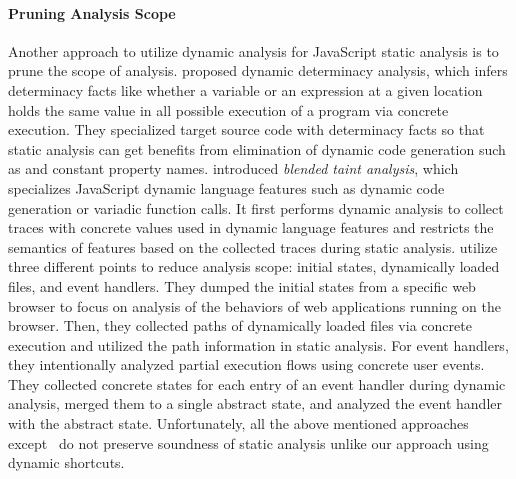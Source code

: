 \paragraph{Pruning Analysis Scope}
Another approach to utilize dynamic analysis for JavaScript static analysis is
to prune the scope of analysis.  \citet{determinacy} proposed dynamic
determinacy analysis, which infers determinacy facts like whether a
variable or an expression at a given location holds the same value in
all possible execution of a program via concrete execution.
They specialized target source code with determinacy
facts so that static analysis can get benefits from elimination of dynamic code
generation such as  and constant property names.
\citet{blended} introduced \textit{blended taint analysis}, which specializes JavaScript dynamic
language features such as dynamic code generation or variadic function calls.
It first performs dynamic analysis to collect traces with concrete values used
in dynamic language features and restricts the semantics of features based on the
collected traces during static analysis.  \citet{battles, eha} utilize three different points to reduce
analysis scope: initial states, dynamically loaded files, and event handlers.
They dumped the initial states from a specific web browser to focus on
analysis of the behaviors of web applications running on the browser.
Then, they collected paths of dynamically loaded files via concrete
execution and utilized the path information in static analysis.
For event handlers, they intentionally analyzed partial execution flows using concrete user events.
They collected concrete states for each entry of an event handler
during dynamic analysis, merged them to a single abstract state, and analyzed
the event handler with the abstract state.
Unfortunately, all the above mentioned approaches except~\cite{determinacy} do not preserve
soundness of static analysis unlike our approach using dynamic shortcuts.


% 

% 
